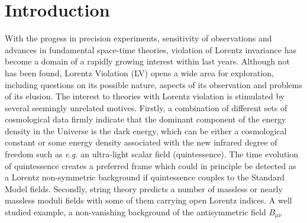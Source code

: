 \documentclass[12pt]{revtex4}
\begin{document}
\newpage

\setcounter{footnote}{0}
\setcounter{equation}{0}


\section{Introduction}
\label{Intro}

With the progess in precision experiments, sensitivity of observations
and advances in fundamental space-time theories,
violation of Lorentz invariance has become a domain of a rapidly growing interest within last
years. 
Although not has been found, Lorentz Violation (LV) opens a wide area 
for exploration, including
questions on its possible nature, aspects of its observation and problems
of its elusion.
The interest to 
theories with Lorentz violation is stimulated by several seemingly 
unrelated motives. Firstly, a combination of different sets of 
cosmological data firmly indicate that the dominant 
component of the energy density in the Universe is the dark energy, 
which can be either a cosmological constant or some energy density 
associated with the new infrared degree of freedom such as {\em e.g.} 
an ultra-light scalar field (quintessence). 
The time evolution of quintessence creates a preferred frame 
which could in principle be detected as a Lorentz non-symmetric background if 
quintessence couples to the Standard Model fields. 
Secondly, string theory predicts a number of massless or nearly massless 
moduli fields with some of them carrying open Lorentz indices. A well studied 
example, a non-vanishing background of the antisymmetric field $B_{\mu\nu}$
\end{document}
